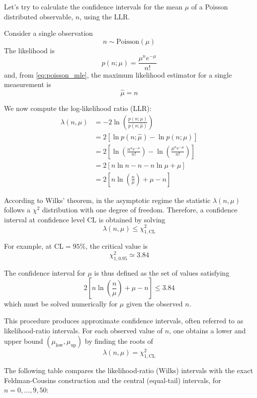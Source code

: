 \begin{example}\label{ex:llr_poissonian}
	Let's try to calculate the confidence intervals for the mean $\mu$ of a Poisson distributed observable, $n$, using the LLR.
	
	Consider a single observation
	\[
	n \sim \text{Poisson}(\mu)
	\]
	The likelihood is
	\[
	p(n;\mu) = \frac{\mu^n e^{-\mu}}{n!}
	\]
	and, from \ref{eq:poisson_mle}, the maximum likelihood estimator for a single measurement is
	\[
	\hat\mu = n
	\]

	We now compute the log-likelihood ratio (LLR):
	\begin{align*}
		\lambda(n, \mu)
		&= -2 \ln \left(\frac{p\left(n;\mu\right)}{p\left(n;\hat\mu\right)}\right) \\
		&= 2 \left[ \ln p(n; \hat\mu) - \ln p(n;\mu) \right] \\
		&= 2 \left[ \ln \left(\frac{n^n e^{-n}}{n!}\right) - \ln \left(\frac{\mu^n e^{-\mu}}{n!}\right) \right] \\
		&= 2 \left[ n \ln n - n - n \ln \mu + \mu \right] \\
		&= 2 \left[ n \ln \left(\frac{n}{\mu}\right) + \mu - n \right]
	\end{align*}
	
	According to Wilks' theorem, in the asymptotic regime the statistic $\lambda(n,\mu)$ follows a $\chi^2$ distribution with one degree of freedom. Therefore, a confidence interval at confidence level $\mathrm{CL}$ is obtained by solving
	\[
	\lambda(n,\mu) \leq \chi^2_{1,\mathrm{CL}}
	\]
	
	For example, at $\mathrm{CL}=95\%$, the critical value is
	\[
	\chi^2_{1,0.95} \simeq 3.84
	\]
	
	The confidence interval for $\mu$ is thus defined as the set of values satisfying
	\[
	2 \left[ n \ln \left(\frac{n}{\mu}\right) + \mu - n \right] \leq 3.84
	\]
	which must be solved numerically for $\mu$ given the observed $n$.
	
	This procedure produces approximate confidence intervals, often referred to as likelihood-ratio intervals. For each observed value of $n$, one obtains a lower and upper bound $(\mu_\text{low}, \mu_\text{up})$ by finding the roots of
	\[
	\lambda(n,\mu) = \chi^2_{1,\mathrm{CL}}
	\]
	
	The following table compares the likelihood-ratio (Wilks) intervals with the exact Feldman-Cousins construction and the central (equal-tail) intervals, for $n = 0, \dots, 9, 50$:
	
	
	

\end{example}
